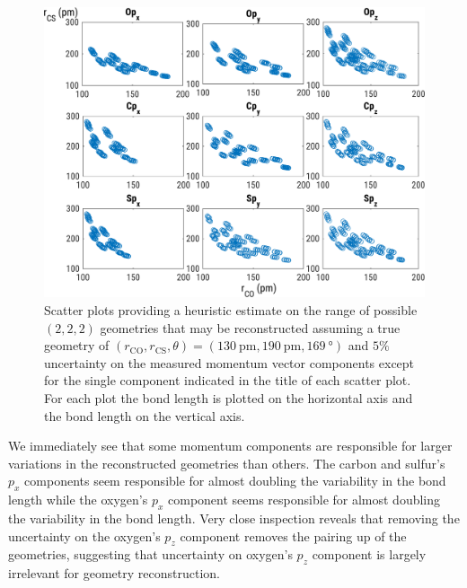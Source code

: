 \begin{figure}
  \centering
  \includegraphics[width=\textwidth]{Plots/OCS222Exploration2}
  \caption[Scatter plots providing a heuristic estimate on the range of possible  $(2,2,2)$ geometries that may be reconstructed assuming a true geometry of $(r_\mathrm{CO}, r_\mathrm{CS}, \theta) = (\SI{130}{\pico\m}, \SI{190}{\pico\m}, \SI{169}{\degree})$ and $5\%$ uncertainty on the measured momentum vector components except for the single component indicated in the title of each scatter plot.]
  {Scatter plots providing a heuristic estimate on the range of possible  $(2,2,2)$ geometries that may be reconstructed assuming a true geometry of $(r_\mathrm{CO}, r_\mathrm{CS}, \theta) = (\SI{130}{\pico\m}, \SI{190}{\pico\m}, \SI{169}{\degree})$ and $5\%$ uncertainty on the measured momentum vector components except for the single component indicated in the title of each scatter plot. For each plot the  bond length is plotted on the horizontal axis and the  bond length on the vertical axis.}
  \label{fig:OCS222DeterminingSource}
\end{figure}

We immediately see that some momentum components are responsible for larger variations in the reconstructed geometries than others. The carbon and sulfur's $p_x$ components seem responsible for almost doubling the variability in the  bond length while the oxygen's $p_x$ component seems responsible for almost doubling the variability in the  bond length. Very close inspection reveals that removing the uncertainty on the oxygen's $p_z$ component removes the pairing up of the geometries, suggesting that uncertainty on oxygen's $p_z$ component is largely irrelevant for geometry reconstruction.

